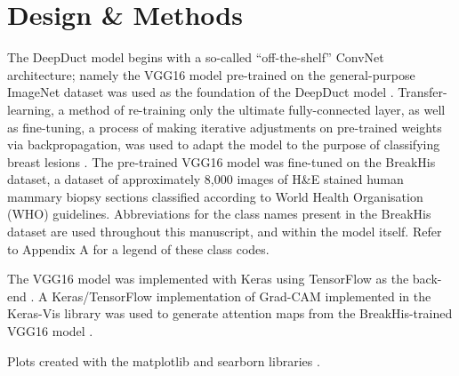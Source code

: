 \section{Design \& Methods}

The DeepDuct model begins with a so-called ``off-the-shelf'' ConvNet architecture; namely the VGG16 model pre-trained on the general-purpose ImageNet dataset was used as the foundation of the DeepDuct model \citep{simonyan2014,deng2009,russakovsky2015}. Transfer-learning, a method of re-training only the ultimate fully-connected layer, as well as fine-tuning, a process of making iterative adjustments on pre-trained weights via backpropagation, was used to adapt the model to the purpose of classifying breast lesions \citep{yosinski2014}. The pre-trained VGG16 model was fine-tuned on the BreakHis dataset, a dataset of approximately 8,000 images of H\&E stained human mammary biopsy sections classified according to World Health Organisation (WHO) guidelines\citep{spanhol2016, who_breast}. Abbreviations for the class names present in the BreakHis dataset are used throughout this manuscript, and within the model itself. Refer to Appendix A for a legend of these class codes. \par

The VGG16 model was implemented with Keras using TensorFlow as the back-end \citep{chollet2015, tensorflow}. A Keras/TensorFlow implementation of Grad-CAM implemented in the Keras-Vis library was used to generate attention maps from the BreakHis-trained VGG16 model \citep{raghakot}.\par

Plots created with the matplotlib and searborn libraries \citep{hunter2007, seaborn}.

